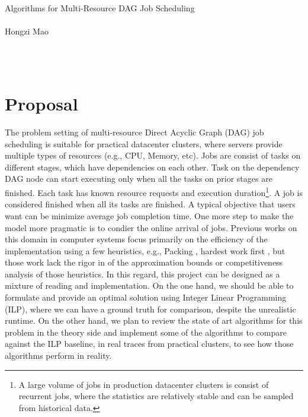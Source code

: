 \documentclass{article}
\begin{document}
\begin{center}
\Large{Algorithms for Multi-Resource DAG Job Scheduling}\\
~\\
\large{Hongzi Mao}
\end{center}
~\\
~\\
\section*{Proposal}

The problem setting of multi-resource Direct Acyclic Graph (DAG) job scheduling is suitable for practical datacenter clusters, where servers provide multiple types of resources (e.g., CPU, Memory, etc). Jobs are consist of tasks on different stages, which have dependencies on each other. Task on the dependency DAG node can start executing only when all the tasks on prior stages are finished. Each task has known resource requests and execution duration\footnote{A large volume of jobs in production datacenter clusters is consist of recurrent jobs, where the statistics are relatively stable and can be sampled from historical data.}. A job is considered finished when all its tasks are finished. A typical objective that users want can be minimize average job completion time. One more step to make the model more pragmatic is to condier the online arrival of jobs. Previous works on this domain in computer systems focus primarily on the efficiency of the implementation using a few heuristics, e.g., Packing \cite{tetris}, hardest work first \cite{graphene}, but those work lack the rigor in of the approximation bounds or competitiveness analysis of those heuristics. In this regard, this project can be designed as a mixture of reading and implementation. On the one hand, we should be able to formulate and provide an optimal solution using Integer Linear Programming (ILP), where we can have a ground truth for comparison, despite the unrealistic runtime. On the other hand, we plan to review the state of art algorithms \cite{vecbin, heuristics, bound13} for this problem in the theory side and implement some of the algorithms to compare against the ILP baseline, in real traces from practical clusters, to see how those algorithms perform in reality. 

{}

\end{document}
